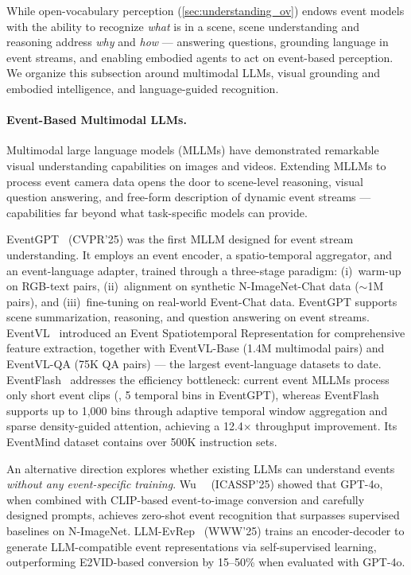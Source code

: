 While open-vocabulary perception (\cref{sec:understanding_ov}) endows event models with the ability to recognize \textit{what} is in a scene, scene understanding and reasoning address \textit{why} and \textit{how} --- answering questions, grounding language in event streams, and enabling embodied agents to act on event-based perception. We organize this subsection around multimodal LLMs, visual grounding and embodied intelligence, and language-guided recognition.

\paragraph{Event-Based Multimodal LLMs.}
Multimodal large language models (MLLMs) have demonstrated remarkable visual understanding capabilities on images and videos. Extending MLLMs to process event camera data opens the door to scene-level reasoning, visual question answering, and free-form description of dynamic event streams --- capabilities far beyond what task-specific models can provide.

EventGPT~\cite{zhou2025eventgpt} (CVPR'25) was the first MLLM designed for event stream understanding. It employs an event encoder, a spatio-temporal aggregator, and an event-language adapter, trained through a three-stage paradigm: (i)~warm-up on RGB-text pairs, (ii)~alignment on synthetic N-ImageNet-Chat data ($\sim$1M pairs), and (iii)~fine-tuning on real-world Event-Chat data. EventGPT supports scene summarization, reasoning, and question answering on event streams. EventVL~\cite{li2025eventvl} introduced an Event Spatiotemporal Representation for comprehensive feature extraction, together with EventVL-Base (1.4M multimodal pairs) and EventVL-QA (75K QA pairs) --- the largest event-language datasets to date. EventFlash~\cite{kong2026eventflash} addresses the efficiency bottleneck: current event MLLMs process only short event clips (\eg, 5 temporal bins in EventGPT), whereas EventFlash supports up to 1,000 bins through adaptive temporal window aggregation and sparse density-guided attention, achieving a 12.4$\times$ throughput improvement. Its EventMind dataset contains over 500K instruction sets.

An alternative direction explores whether existing LLMs can understand events \textit{without any event-specific training}. Wu~\etal~\cite{wu2025llmzeroshot} (ICASSP'25) showed that GPT-4o, when combined with CLIP-based event-to-image conversion and carefully designed prompts, achieves zero-shot event recognition that surpasses supervised baselines on N-ImageNet. LLM-EvRep~\cite{cho2025llmevrep} (WWW'25) trains an encoder-decoder to generate LLM-compatible event representations via self-supervised learning, outperforming E2VID-based conversion by 15--50\% when evaluated with GPT-4o.

